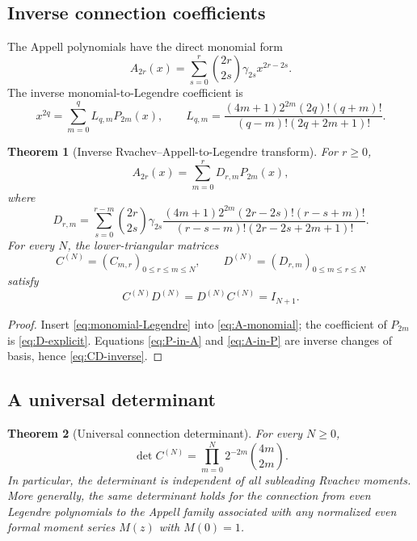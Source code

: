 \documentclass[11pt,oneside]{article}
\newtheorem{theorem}{Theorem}[section]
\theoremstyle{definition}
\theoremstyle{remark}
\begin{document}
\subsection{Inverse connection coefficients}
The Appell polynomials have the direct monomial form
\begin{equation}
 A_{2r}(x)=\sum_{s=0}^{r}\binom{2r}{2s}\gamma_{2s}x^{2r-2s}.
 \label{eq:A-monomial}
\end{equation}
The inverse monomial-to-Legendre coefficient is
\begin{equation}
 x^{2q}=\sum_{m=0}^{q}L_{q,m}P_{2m}(x),
 \qquad
 L_{q,m}=\frac{(4m+1)2^{2m}(2q)!(q+m)!}
 {(q-m)!(2q+2m+1)!}.
 \label{eq:monomial-Legendre}
\end{equation}

\begin{theorem}[Inverse Rvachev--Appell-to-Legendre transform]
\label{thm:D-transform}
For $r\ge0$,
\begin{equation}
 \boxed{A_{2r}(x)=\sum_{m=0}^{r}D_{r,m}P_{2m}(x),}
 \label{eq:A-in-P}
\end{equation}
where
\begin{equation}
 \boxed{
 D_{r,m}=\sum_{s=0}^{r-m}\binom{2r}{2s}\gamma_{2s}
 \frac{(4m+1)2^{2m}(2r-2s)!(r-s+m)!}
 {(r-s-m)!(2r-2s+2m+1)!}.}
 \label{eq:D-explicit}
\end{equation}
For every $N$, the lower-triangular matrices
\begin{equation}
 C^{(N)}=(C_{m,r})_{0\le r\le m\le N},
 \qquad
 D^{(N)}=(D_{r,m})_{0\le m\le r\le N}
 \label{eq:CD-matrices}
\end{equation}
satisfy
\begin{equation}
 C^{(N)}D^{(N)}=D^{(N)}C^{(N)}=I_{N+1}.
 \label{eq:CD-inverse}
\end{equation}
\end{theorem}

\begin{proof}
Insert \eqref{eq:monomial-Legendre} into \eqref{eq:A-monomial}; the coefficient
of $P_{2m}$ is \eqref{eq:D-explicit}.  Equations \eqref{eq:P-in-A} and
\eqref{eq:A-in-P} are inverse changes of basis, hence
\eqref{eq:CD-inverse}.
\end{proof}

\subsection{A universal determinant}
\begin{theorem}[Universal connection determinant]
\label{thm:C-determinant}
For every $N\ge0$,
\begin{equation}
 \boxed{
 \det C^{(N)}=
 \prod_{m=0}^{N}2^{-2m}\binom{4m}{2m}.}
 \label{eq:C-det}
\end{equation}
In particular, the determinant is independent of all subleading Rvachev
moments.  More generally, the same determinant holds for the connection from
even Legendre polynomials to the Appell family associated with any normalized
even formal moment series $M(z)$ with $M(0)=1$.
\end{theorem}
\end{document}
